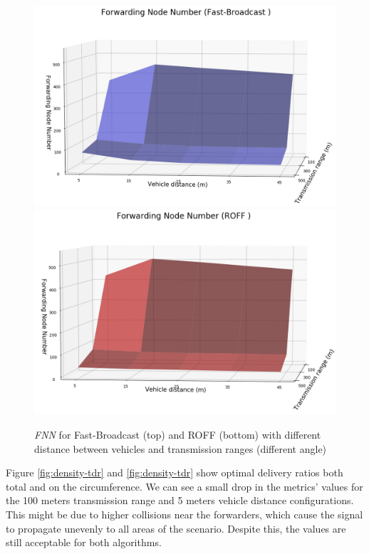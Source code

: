 		\begin{figure}[H]
			\centering
			\includegraphics[width=1.0\textwidth]{immagini/density/fb/fnn-2}
			\includegraphics[width=1.0\textwidth]{immagini/density/roff/fnn-2}
			\caption{\textit{FNN} for Fast-Broadcast (top) and ROFF (bottom) with different distance between vehicles and transmission ranges (different angle)}
			\label{fig:density-fnn-2}
		\end{figure}
	
		Figure \ref{fig:density-tdr} and \ref{fig:density-tdr} show optimal delivery ratios both total and on the circumference. We can see a small drop in the metrics' values for the 100 meters transmission range and 5 meters vehicle distance configurations. This might be due to higher collisions near the forwarders, which cause the signal to propagate unevenly to all areas of the scenario. Despite this, the values are still acceptable for both algorithms.
		
